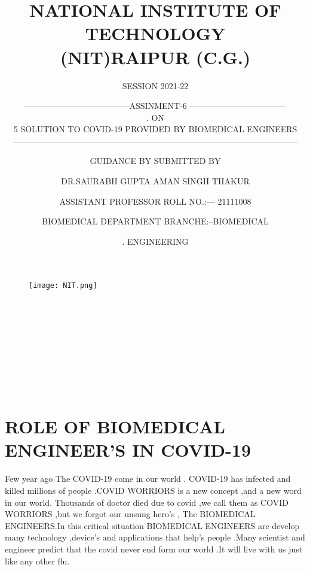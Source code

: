 \documentclass[12pt]{article}
\title{NATIONAL INSTITUTE OF TECHNOLOGY\\
(NIT)RAIPUR (C.G.)}
\author {SESSION 2021-22}
\date{}
\begin{document}
\maketitle
\begin{figure}[h]
\centering
\texttt{[image: NIT.png]}
\end{figure}
\author{--------------------------------------ASSINMENT-6 ----------------------------------- \\
.\> \>\> \>\> \>\>\> \>\> \>\>\>\>\>\>  \>\> \>\>\> \>\> \>\> \> \>\> \>\> \>\> \> \>\> \>\> \>\> ON\\ 
 5 SOLUTION TO COVID-19 PROVIDED BY BIOMEDICAL ENGINEERS \\
------------------------------------------------------------------------------------------------------
 }\\


\author{GUIDANCE BY \> \>\> \>\> \>\>\> \>\> \>\>\>\>\>\>  \>\> \>\>\> \>\> \>\> \> \>\> \>\> \>\> \>\>  SUBMITTED BY }\\


\author{DR.SAURABH GUPTA\>  \>\> \>\> \>  \>\> \>\>\>\>\>  \>\> \>\>\>  \>\> \>\> \>  \>\> AMAN SINGH THAKUR }\\

\author{ ASSISTANT PROFESSOR\>  \>\> \>  \> \>   \>\> \>\> \> \>\> \> \>\> \>  ROLL NO.:--- 21111008 }\\
\author{BIOMEDICAL DEPARTMENT\>  \>\> \>\> \>  \>\> \>\> \>\>   \>\> BRANCHE:--BIOMEDICAL  }\\
\author{.\>   \>\> \>\> \>  \>\> \>\> \>\> \>\> \>\> \>  \>\> \>\> \>\>\>\> \>\> \>\>  \>\> \>\> \>\> \>\>\> \>\> \>   \>\> \>\> \>\> \>\>\> \>\> \>    \>\> \>\> \>\> \>\> \>\> \>  \>\> \>\> \>\>  \>\> ENGINEERING }
\clearpage
\tableofcontents
\clearpage
\section{ROLE OF BIOMEDICAL ENGINEER'S IN COVID-19}
Few year ago The COVID-19 come in our world . COVID-19 has infected and killed millions of people .COVID WORRIORS is a new concept ,and a new word in our world. Thousands of doctor died due to covid ,we call them as COVID WORRIORS  ,but we forgot our unsung hero's , The BIOMEDICAL ENGINEERS.In this critical situation BIOMEDICAL ENGINEERS are develop many technology ,device's and applications that help's people .Many scientist  and engineer predict that  the covid never end   form our  world .It  will  live with us just like any other flu.\\
\end{document}
